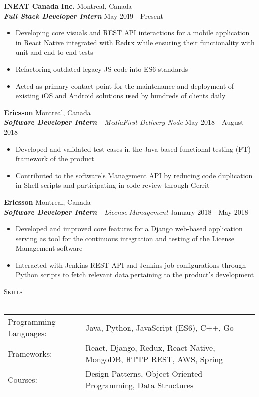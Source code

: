 \documentclass[a4paper]{article}
\newcommand{\lineunder} {
    \vspace*{-8pt} \\
    \hspace*{-18pt} \hrulefill \\
}
\newcommand{\header} [1] {
    {\hspace*{-18pt}\vspace*{6pt} \textsc{#1}}
    \vspace*{-6pt} \lineunder
}
\begin{document}
\textbf{INEAT Canada Inc.} \hfill Montreal, Canada\\
\textit{\textbf{Full Stack Developer Intern}} \hfill May 2019 - Present\\
\vspace{0.2mm}
\begin{itemize} \itemsep 0.3pt
	\item Developing core visuals and REST API interactions for a mobile application in React Native integrated with Redux while ensuring their functionality with unit and end-to-end tests
	\item Refactoring outdated legacy JS code into ES6 standards
	\item Acted as primary contact point for the maintenance and deployment of existing iOS and Android solutions used by hundreds of clients daily
\end{itemize}
\textbf{Ericsson} \hfill Montreal, Canada\\
\textit{\textbf{Software Developer Intern} - MediaFirst Delivery Node} \hfill May 2018 - August 2018\\
\vspace{0.2mm}
\begin{itemize} \itemsep 0.3pt
	\item Developed and validated test cases in the Java-based functional testing (FT) framework of the product
	\item Contributed to the software's Management API by reducing code duplication in Shell scripts and participating in code review through Gerrit
\end{itemize}
\textbf{Ericsson} \hfill Montreal, Canada\\
\textit{\textbf{Software Developer Intern} - License Management} \hfill January 2018 - May 2018\\
\vspace{0.2mm}
\begin{itemize} \itemsep 0.3pt
	\item Developed and improved core features for a Django web-based application serving as tool for the continuous integration and testing of the License Management software
	\item Interacted with Jenkins REST API and Jenkins job configurations through Python scripts to fetch relevant data pertaining to the product's development
\end{itemize}

\header{Skills}
\vspace*{2mm}
\begin{tabular}{ l l }
	Programming Languages: & Java, Python, JavaScript (ES6), C++, Go                             \\
	Frameworks:            & React, Django, Redux, React Native, MongoDB, HTTP REST, AWS, Spring \\
	Courses:               & Design Patterns, Object-Oriented Programming, Data Structures       \\
\end{tabular}
\vspace{2mm}
\end{document}
